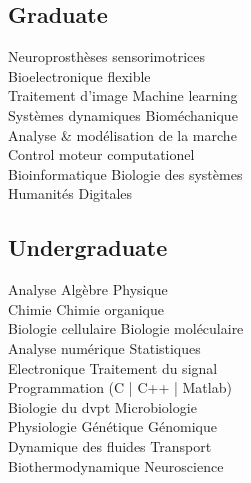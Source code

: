 \documentclass[a4paper]{cv}
\begin{document}
\begin{minipage}[t]{0.33\textwidth}

\education

\coursework

\subsection{Graduate}
Neuroprosthèses sensorimotrices\\
Bioelectronique flexible\\
Traitement d'image \tbl{} Machine learning\\
Systèmes dynamiques \tbl{} Bioméchanique\\
Analyse \& modélisation de la marche\\
Control moteur computationel\\
Bioinformatique \tbl{} Biologie des systèmes\\
Humanités Digitales
\sectionspace

\subsection{Undergraduate}
Analyse \tbl{} Algèbre \tbl{} Physique\\
Chimie \tbl{} Chimie organique\\
Biologie cellulaire \tbl{} Biologie moléculaire\\
Analyse numérique \tbl{} Statistiques\\
Electronique \tbl{} Traitement du signal\\
Programmation (C | C++ | Matlab)\\
Biologie du dvpt \tbl{} Microbiologie\\
Physiologie \tbl{} Génétique \tbl{} Génomique\\
Dynamique des fluides \tbl{} Transport\\
Biothermodynamique \tbl{} Neuroscience
\sectionspace

\languages

\hobbies

\end{minipage}
\publications
\end{document}
